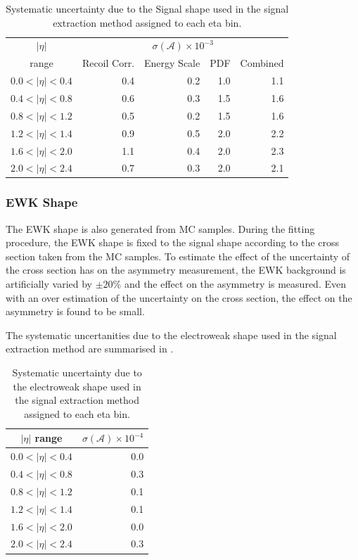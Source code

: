 \begin{table}[htbp]
\begin{center}
\begin{tabular}{crrrr}
    \toprule
$|\eta|$   & \multicolumn{4}{c}{$\sigma(\mathcal{A}) \times 10^{-3}$}\\
range      & Recoil Corr. & Energy Scale & PDF & Combined \\
\midrule
$0.0<|\eta|<0.4$ &  0.4 & 0.2 & 1.0  & 1.1 \\
$0.4<|\eta|<0.8$ &  0.6 & 0.3 & 1.5  & 1.6 \\
$0.8<|\eta|<1.2$ &  0.5 & 0.2 & 1.5  & 1.6 \\
$1.2<|\eta|<1.4$ &  0.9 & 0.5 & 2.0  & 2.2 \\
$1.6<|\eta|<2.0$ &  1.1 & 0.4 & 2.0  & 2.3 \\
$2.0<|\eta|<2.4$ &  0.7 & 0.3 & 2.0  & 2.1 \\
    \bottomrule
\end{tabular}
\caption{\label{tab:systSIG}Systematic uncertainty due to the Signal \ETm shape used in the signal
extraction method assigned to each eta bin.}
\end{center}
\end{table}

\subsubsection{\ac{EWK} \ETm Shape}

The \ac{EWK} shape is also generated from \ac{MC} samples. During the fitting
procedure, the \ac{EWK} shape is fixed to the \Wenu signal shape according to
the cross section taken from the \ac{MC} samples. To estimate the effect of the
uncertainty of the cross section has on the asymmetry measurement, the \ac{EWK}
background is artificially varied by $\pm20\%$ and the effect on the
asymmetry is measured. Even with an over estimation of the uncertainty on the
cross section, the effect on the asymmetry is found to be small.

The systematic uncertanities due to the electroweak \ETm shape used in the signal
extraction method are summarised in .

\begin{table}[htbp]
\begin{center}
\begin{tabular}{cr}
    \toprule
$|\eta|$ range & $\sigma(\mathcal{A}) \times 10^{-4}$\\
\midrule
$0.0<|\eta|<0.4$ & 0.0\\
$0.4<|\eta|<0.8$ & 0.3\\
$0.8<|\eta|<1.2$ & 0.1\\
$1.2<|\eta|<1.4$ & 0.1\\
$1.6<|\eta|<2.0$ & 0.0\\
$2.0<|\eta|<2.4$ & 0.3\\
    \bottomrule
\end{tabular}
\caption{\label{tab:systEWK}Systematic uncertainty due to the electroweak \ETm shape used in the signal extraction method assigned to each eta bin.}
\end{center}
\end{table}

